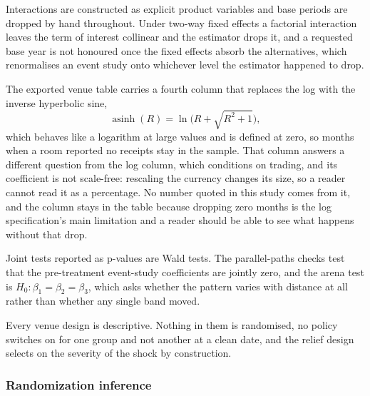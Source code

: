 Interactions are constructed as explicit product variables and base periods
are dropped by hand throughout. Under two-way fixed effects a factorial
interaction leaves the term of interest collinear and the estimator drops
it, and a requested base year is not honoured once the fixed effects
absorb the alternatives, which renormalises an event study onto whichever
level the estimator happened to drop.

The exported venue table carries a fourth column that replaces the log with
the inverse hyperbolic sine,
\[
\operatorname{asinh}(R) = \ln\bigl(R + \sqrt{R^{2}+1}\bigr),
\]
which behaves like a logarithm at large values and is defined at zero, so
months when a room reported no receipts stay in the sample. That column
answers a different question from the log column, which conditions on
trading, and its coefficient is not scale-free: rescaling the currency
changes its size, so a reader cannot read it as a percentage. No number
quoted in this study comes from it, and the column stays in the table
because dropping zero months is the log specification's main limitation and
a reader should be able to see what happens without that drop.

Joint tests reported as p-values are Wald tests. The parallel-paths checks
test that the pre-treatment event-study coefficients are jointly zero, and
the arena test is \(H_0: \beta_1 = \beta_2 = \beta_3\), which asks whether
the pattern varies with distance at all rather than whether any single band
moved.

Every venue design is descriptive. Nothing in them is randomised, no policy
switches on for one group and not another at a clean date, and the relief
design selects on the severity of the shock by construction.

\subsubsection*{Randomization inference}

